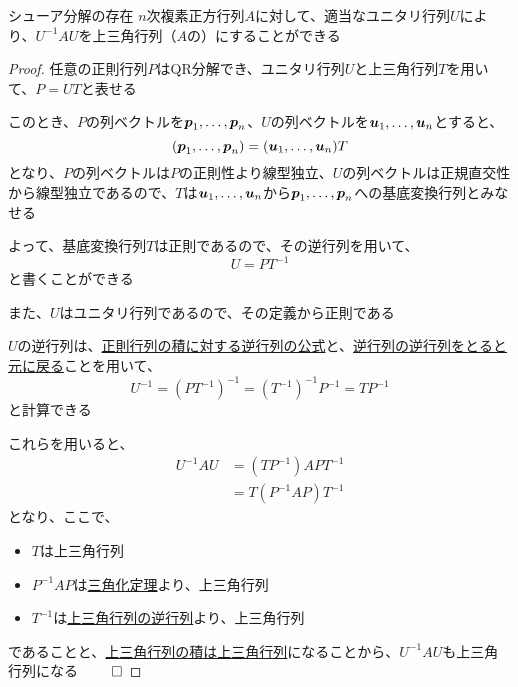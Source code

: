 \documentclass[../../../topic_linear-algebra]{subfiles}
\begin{document}
\begin{theorem*}{シューア分解の存在}
  $n$次複素正方行列$A$に対して、適当なユニタリ行列$U$により、$U^{-1}AU$を上三角行列（$A$の）にすることができる
\end{theorem*}

\begin{proof}
  任意の正則行列$P$はQR分解でき、ユニタリ行列$U$と上三角行列$T$を用いて、$P = UT$と表せる

  このとき、$P$の列ベクトルを$\vb*{p}_1,\ldots,\vb*{p}_n$、$U$の列ベクトルを$\vb*{u}_1,\ldots,\vb*{u}_n$とすると、
  \begin{equation*}
    (\vb*{p}_1,\ldots,\vb*{p}_n) = (\vb*{u}_1,\ldots,\vb*{u}_n) T
  \end{equation*}
  となり、$P$の列ベクトルは$P$の正則性より線型独立、$U$の列ベクトルは正規直交性から線型独立であるので、$T$は$\vb*{u}_1,\ldots,\vb*{u}_n$から$\vb*{p}_1,\ldots,\vb*{p}_n$への基底変換行列とみなせる

  よって、基底変換行列$T$は正則であるので、その逆行列を用いて、
  \begin{equation*}
    U = P T^{-1}
  \end{equation*}
  と書くことができる

  \br

  また、$U$はユニタリ行列であるので、その定義から正則である

  $U$の逆行列は、\hyperref[thm:inverse-of-product]{正則行列の積に対する逆行列の公式}と、\hyperref[thm:inverse-of-inverse]{逆行列の逆行列をとると元に戻る}ことを用いて、
  \begin{equation*}
    U^{-1} =(P T^{-1})^{-1} = (T^{-1})^{-1} P^{-1} = T P^{-1}
  \end{equation*}
  と計算できる

  \br

  これらを用いると、
  \begin{align*}
    U^{-1}AU & = (T P^{-1})A P T^{-1} \\
             & = T (P^{-1}AP) T^{-1}
  \end{align*}
  となり、ここで、
  \begin{itemize}
    \item $T$は上三角行列
    \item $P^{-1}AP$は\hyperref[thm:triangularization-theorem]{三角化定理}より、上三角行列
    \item $T^{-1}$は\hyperref[thm:inverse-of-upper-triangular]{上三角行列の逆行列}より、上三角行列
  \end{itemize}
  であることと、\hyperref[thm:product-of-upper-triangular]{上三角行列の積は上三角行列}になることから、$U^{-1}AU$も上三角行列になる $\qed$
\end{proof}
\end{document}

